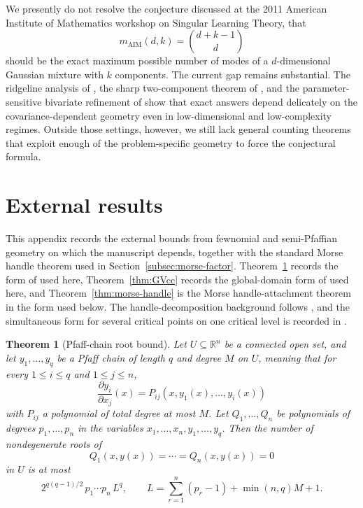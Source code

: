 \documentclass[11pt]{article}
\theoremstyle{plain}
\newtheorem{theorem}{Theorem}[section]
\theoremstyle{definition}
\theoremstyle{remark}
\numberwithin{equation}{section}
\newcommand{\R}{\mathbb{R}}
\begin{document}
We presently do not resolve the conjecture discussed at the 2011 American Institute of Mathematics workshop on Singular Learning Theory, that
\[
m_{\mathrm{AIM}}(d,k)=\binom{d+k-1}{d}
\]
should be the exact maximum possible number of modes of a $d$-dimensional Gaussian mixture with $k$ components. The current gap remains substantial. The ridgeline analysis of \citet{RayLindsay2005}, the sharp two-component theorem of \citet{RayRen2012}, and the parameter-sensitive bivariate refinement of \citet{KabataMatsumotoUchidaUeki2025} show that exact answers depend delicately on the covariance-dependent geometry even in low-dimensional and low-complexity regimes. Outside those settings, however, we still lack general counting theorems that exploit enough of the problem-specific geometry to force the conjectural formula.

\appendix
\renewcommand{\theHsection}{appendix.\Alph{section}}
\renewcommand{\theHsubsection}{appendix.\Alph{section}.\arabic{subsection}}
\renewcommand{\theHequation}{appendix.\Alph{section}.\arabic{equation}}

\section{External results}\label{app:external}

This appendix records the external bounds from fewnomial and semi-Pfaffian geometry on which the manuscript depends, together with the standard Morse handle theorem used in Section~\ref{subsec:morse-factor}. Theorem~\ref{thm:Khov} records the form of \citet[Section 3.12, Corollary~5]{Khovanskii1991} used here, Theorem~\ref{thm:GVcc} records the global-domain form of \citet[Corollary~3.3]{GabrielovVorobjov2004} used here, and Theorem~\ref{thm:morse-handle} is the Morse handle-attachment theorem in the form used below. The handle-decomposition background follows \citet[Chapter~3]{Knudson2015}, and the simultaneous form for several critical points on one critical level is recorded in \citet[Remark~2.9]{Nicolaescu2011}.

\begin{theorem}[Pfaff-chain root bound]\label{thm:Khov}
Let $U\subseteq\R^n$ be a connected open set, and let $y_1,\dots,y_q$ be a Pfaff chain of length $q$ and degree $M$ on $U$, meaning that for every $1\le i\le q$ and $1\le j\le n$,
\[
\frac{\partial y_i}{\partial x_j}(x)=P_{ij}(x,y_1(x),\dots,y_i(x))
\]
with $P_{ij}$ a polynomial of total degree at most $M$. Let $Q_1,\dots,Q_n$ be polynomials of degrees $p_1,\dots,p_n$ in the variables $x_1,\dots,x_n,y_1,\dots,y_q$. Then the number of nondegenerate roots of
\[
Q_1(x,y(x))=\cdots=Q_n(x,y(x))=0
\]
in $U$ is at most
\[
2^{q(q-1)/2}\,p_1\cdots p_n\,L^q,
\qquad
L=\sum_{r=1}^n (p_r-1)+\min(n,q)M+1.
\]
\end{theorem}
\end{document}
